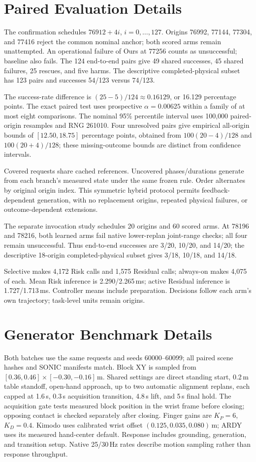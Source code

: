 \documentclass[letterpaper,10pt,conference]{ieeeconf}
\begin{document}
\section{Paired Evaluation Details}
The confirmation schedules $76912+4i$, $i=0,\ldots,127$. Origins 76992, 77144, 77304, and 77416 reject the common nominal anchor; both scored arms remain unattempted. An operational failure of Ours at 77256 counts as unsuccessful; baseline also fails. The 124 end-to-end pairs give 49 shared successes, 45 shared failures, 25 rescues, and five harms. The descriptive completed-physical subset has 123 pairs and successes 54/123 versus 74/123.

The success-rate difference is $(25-5)/124\approx0.16129$, or 16.129 percentage points. The exact paired test uses prospective $\alpha=0.00625$ within a family of at most eight comparisons. The nominal 95\% percentile interval uses 100,000 paired-origin resamples and RNG 261010. Four unresolved pairs give empirical all-origin bounds of $[12.50,18.75]$ percentage points, obtained from $100(20-4)/128$ and $100(20+4)/128$; these missing-outcome bounds are distinct from confidence intervals.

Covered requests share cached references. Uncovered phases/durations generate from each branch's measured state under the same frozen rule. Order alternates by original origin index. This symmetric hybrid protocol permits feedback-dependent generation, with no replacement origins, repeated physical failures, or outcome-dependent extensions.

The separate invocation study schedules 20 origins and 60 scored arms. At 78196 and 78216, both learned arms fail native lower-replan joint-range checks; all four remain unsuccessful. Thus end-to-end successes are 3/20, 10/20, and 14/20; the descriptive 18-origin completed-physical subset gives 3/18, 10/18, and 14/18.

Selective makes 4,172 Risk calls and 1,575 Residual calls; always-on makes 4,075 of each. Mean Risk inference is 2.290/2.265\,ms; active Residual inference is 1.727/1.713\,ms. Controller means include preparation. Decisions follow each arm's own trajectory; task-level units remain origins.

\section{Generator Benchmark Details}
Both batches use the same requests and seeds 60000--60099; all paired scene hashes and SONIC manifests match. Block XY is sampled from $[0.36,0.46]\times[-0.30,-0.16]$\,m. Shared settings are direct standing start, 0.2\,m table standoff, open-hand approach, up to two automatic alignment replans, each capped at 1.6\,s, 0.3\,s acquisition transition, 4.8\,s lift, and 5\,s final hold. The acquisition gate tests measured block position in the wrist frame before closing; opposing contact is checked separately after closing. Finger gains are $K_P=6$, $K_D=0.4$. Kimodo uses calibrated wrist offset $(0.125,0.035,0.080)$\,m; ARDY uses its measured hand-center default. Response includes grounding, generation, and transition setup. Native 25/30\,Hz rates describe motion sampling rather than response throughput.
\end{document}
